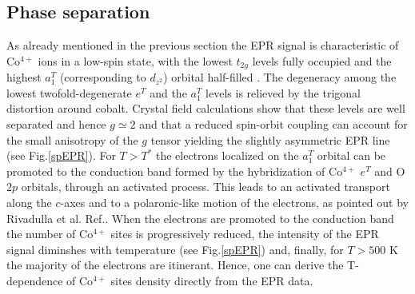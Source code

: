 \documentclass[prb,showpacs,preprintnumbers,amsmath,amssymb,floatfix]{revtex4}
\begin{document}
\subsection{Phase separation}

As already mentioned in the previous section the EPR signal is
characteristic of Co$^{4+}$ ions in a low-spin state, with the
lowest $t_{2g}$ levels fully occupied and the highest $a_1^T$
(corresponding to $d_{z^2}$) orbital half-filled
\cite{Good,Baskaran}. The degeneracy among the lowest
twofold-degenerate $e^T$ and the $a_1^T$ levels is relieved by the
trigonal distortion around cobalt. Crystal field calculations show
that these levels are well separated and hence $g\simeq 2$ and
that a reduced spin-orbit coupling can account for the small
anisotropy of the $g$ tensor yielding the slightly asymmetric EPR
line (see Fig.\ref{spEPR}). For $T>T^*$ the electrons localized on
the $a_1^T$ orbital can be promoted to the conduction band formed
by the hybridization of Co$^{4+}$ $e^T$ and O $2p$ orbitals,
through an activated process. This leads to an activated transport
along the $c$-axes \cite{resist} and to a polaronic-like motion of
the electrons, as pointed out by Rivadulla et al.
Ref.. When the electrons are promoted to the
conduction band the number of Co$^{4+}$ sites is progressively
reduced, the intensity of the EPR signal diminshes with
temperature (see Fig.\ref{spEPR}) and, finally, for $T
> 500$ K the majority of the electrons are itinerant. Hence, one
can derive the T-dependence of Co$^{4+}$ sites density directly
from the EPR data.
\end{document}
